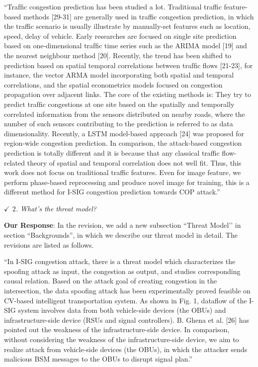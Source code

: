 \documentclass{amsart}
\theoremstyle{definition}
\theoremstyle{remark}
\numberwithin{equation}{section}
\begin{document}
``Trafﬁc congestion prediction has been studied a lot. Traditional traffic feature-based methods [29-31] are generally used in traffic congestion prediction, in which the traffic scenario is usually illustrate by manually-set features such as location, speed, delay of vehicle. Early researches are focused on single site prediction based on one-dimensional trafﬁc time series such as the ARIMA model [19] and the nearest neighbour method [20]. Recently, the trend has been shifted to prediction based on spatial temporal correlations between trafﬁc ﬂows [21-23], for instance, the vector ARMA model incorporating both spatial and temporal correlations, and the spatial econometrics models focused on congestion propagation over adjacent links. The core of the existing methods is: They try to predict trafﬁc congestions at one site based on the spatially and temporally correlated information from the sensors distributed on nearby roads, where the number of such sensors contributing to the prediction is referred to as data dimensionality. Recently, a LSTM model-based approach [24] was proposed for region-wide congestion prediction. In comparison, the attack-based congestion prediction is totally different and it is because that any classical traffic flow-related theory of spatial and temporal correlation does not well fit. Thus, this work does not focus on traditional traffic features. Even for image feature, we perform phase-based reprocessing and produce novel image for training, this is a different method for I-SIG congestion prediction towards COP attack.''


\emph{$\checkmark$ $2$. What's the threat model?}

\textbf{Our Response}:
In the revision, we add a new subsection ``Threat Model’’ in section ``Backgrounds'', in which we describe our threat model in detail. The revisions are listed as follows.

``In I-SIG congestion attack, there is a threat model which characterizes the spoofing attack as input, the congestion as output, and studies corresponding causal relation. Based on the attack goal of creating congestion in the intersection, the data spoofing attack has been experimentally proved feasible on CV-based intelligent transportation system. As shown in Fig. 1, dataflow of the I-SIG system involves data from both vehicle-side devices (the OBUs) and infrastructure-side device (RSUs and signal controllers). B. Ghena et al. [26] has pointed out the weakness of the infrastructure-side device. In comparison, without considering the weakness of the infrastructure-side device, we aim to realize attack from vehicle-side devices (the OBUs), in which the attacker sends malicious BSM messages to the OBUs to disrupt signal plan.''
\end{document}
